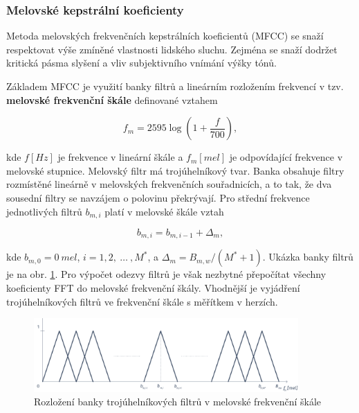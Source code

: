 \subsubsection{Melovské kepstrální koeficienty}

Metoda melovských frekvenčních kepstrálních koeficientů (MFCC) se snaží respektovat výše zmíněné vlastnosti lidského sluchu. Zejména se snaží dodržet kritická pásma slyšení a vliv subjektivního vnímání výšky tónů.

Základem MFCC je využití banky filtrů a lineárním rozložením frekvencí v tzv. \textbf{melovské frekvenční škále} definované vztahem

\begin{equation}
  f_m = 2595 \log \left(1 + \frac{f}{700}\right),
  \label{eq:asr:mfcc:melscale}
\end{equation}

\noindent kde $f \left[Hz\right]$ je frekvence v lineární škále a $f_m \left[mel\right]$ je odpovídající frekvence v melovské stupnice. Melovský filtr má trojúhelníkový tvar. Banka obsahuje filtry rozmístěné lineárně v melovských frekvenčních souřadnicích, a to tak, že dva sousední filtry se navzájem o polovinu překrývají. Pro střední frekvence jednotlivých filtrů $b_{m,i}$ platí v melovské škále vztah

\begin{equation}
  b_{m,i} = b_{m,i-1} + \Delta_{m},
  \label{eq:asr:mfcc:freq}
\end{equation}

\noindent kde $b_{m, 0} = 0\ mel$, $i = 1, 2,\ \dots\ , M^{*}$, a $\Delta_m = B_{m,w} / (M^{*} + 1)$. Ukázka banky filtrů je na obr. \ref{fig:asr:mfcc:bank:mel}. Pro výpočet odezvy filtrů je však nezbytné přepočítat všechny koeficienty FFT do melovské frekvenční škály. Vhodnější je vyjádření trojúhelníkových filtrů ve frekvenční škále s měřítkem v herzích.

\begin{figure}[hbpt]
  \centering
  \includegraphics[width=0.9\textwidth]{./ch4-asr/img/filter_bank-mel.pdf}
  \caption{Rozložení banky trojúhelníkových filtrů v melovské frekvenční škále}
  \label{fig:asr:mfcc:bank:mel}
\end{figure}


